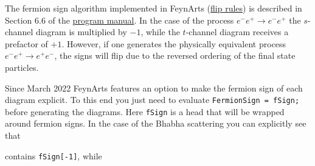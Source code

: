 \documentclass[../FeynCalcManual.tex]{subfiles}
\begin{document}
The fermion sign algorithm implemented in FeynArts
(\href{https://inspirehep.net/literature/336411}{flip rules}) is
described in Section 6.6 of the
\href{http://www.feynarts.de/FA3Guide.pdf}{program manual}. In the case
of the process \(e^- e^+ \to e^- e^+\) the \(s\)-channel diagram is
multiplied by \(-1\), while the \(t\)-channel diagram receives a
prefactor of \(+1\). However, if one generates the physically equivalent
process \(e^- e^+ \to e^+ e^-\), the signs will flip due to the reversed
ordering of the final state particles.

Since March 2022 FeynArts features an option to make the fermion sign of
each diagram explicit. To this end you just need to evaluate
\texttt{FermionSign = fSign;} before generating the diagrams. Here
\texttt{fSign} is a head that will be wrapped around fermion signs. In
the case of the Bhabha scattering you can explicitly see that

\begin{Shaded}
\begin{Highlighting}[]
\ExtensionTok{=}\OperatorTok{[}\OperatorTok{[}\OperatorTok{,}  \OtherTok{{-}\textgreater{}} \OperatorTok{],} \OperatorTok{\{}\OperatorTok{[}\OperatorTok{,} \OperatorTok{\{}\OperatorTok{\}],} \SpecialCharTok{{-}}\OperatorTok{[}\OperatorTok{,} \OperatorTok{\{}\OperatorTok{\}]\}} \OtherTok{{-}\textgreater{}} 
\OperatorTok{\{}\OperatorTok{[}\OperatorTok{,} \OperatorTok{\{}\OperatorTok{\}],} \SpecialCharTok{{-}}\OperatorTok{[}\OperatorTok{,} \OperatorTok{\{}\OperatorTok{\}]\},}\OtherTok{{-}\textgreater{}} \OperatorTok{\{}\OperatorTok{\},}\OtherTok{{-}\textgreater{}}\OperatorTok{]}\NormalTok{;}
\OperatorTok{[}\OperatorTok{,}\OtherTok{{-}\textgreater{}}\OperatorTok{]}
\end{Highlighting}
\end{Shaded}

contains \texttt{fSign[\allowbreak{}-1]}, while
\end{document}
